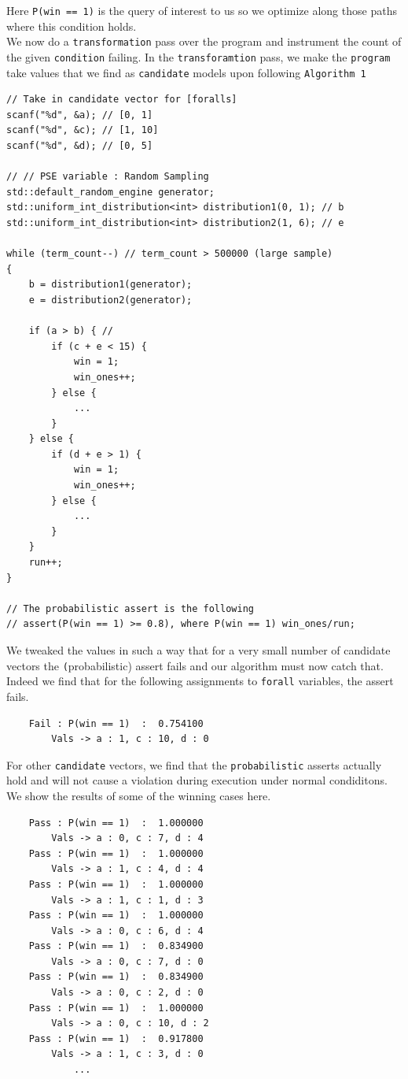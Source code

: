 \documentclass{article}
\begin{document}
Here \texttt{P(win == 1)} is the query of interest to us so we optimize along those paths where this condition holds. \\   

We now do a \texttt{transformation} pass over the program and instrument the count of the given \texttt{condition} failing. In the \texttt{transforamtion} pass, we make the \texttt{program} take values that we find as \texttt{candidate} models upon following \texttt{Algorithm 1}

\begin{verbatim}
// Take in candidate vector for [foralls]
scanf("%d", &a); // [0, 1]
scanf("%d", &c); // [1, 10]
scanf("%d", &d); // [0, 5]

// // PSE variable : Random Sampling
std::default_random_engine generator;
std::uniform_int_distribution<int> distribution1(0, 1); // b
std::uniform_int_distribution<int> distribution2(1, 6); // e

while (term_count--) // term_count > 500000 (large sample)
{
	b = distribution1(generator);
	e = distribution2(generator);
	
	if (a > b) { // 
		if (c + e < 15) {
			win = 1;
			win_ones++;
		} else {
			...
		}
	} else {
		if (d + e > 1) {
			win = 1;
			win_ones++;
		} else {
			...
		}
	}
	run++;
} 

// The probabilistic assert is the following
// assert(P(win == 1) >= 0.8), where P(win == 1) win_ones/run;

\end{verbatim}

We tweaked the values in such a way that for a very small number of candidate vectors the \texttt(probabilistic) assert fails and our algorithm must now catch that. Indeed we find that for the following assignments to \texttt{forall} variables, the assert fails.

\begin{verbatim}
	Fail : P(win == 1)  :  0.754100
		Vals -> a : 1, c : 10, d : 0
\end{verbatim}

For other \texttt{candidate} vectors, we find that the \texttt{probabilistic} asserts actually hold and will not cause a violation during execution under normal condiditons. We show the results of some of the winning cases here. 

\begin{verbatim}
	Pass : P(win == 1)  :  1.000000
		Vals -> a : 0, c : 7, d : 4
	Pass : P(win == 1)  :  1.000000
		Vals -> a : 1, c : 4, d : 4
	Pass : P(win == 1)  :  1.000000
		Vals -> a : 1, c : 1, d : 3
	Pass : P(win == 1)  :  1.000000
		Vals -> a : 0, c : 6, d : 4
	Pass : P(win == 1)  :  0.834900
		Vals -> a : 0, c : 7, d : 0
	Pass : P(win == 1)  :  0.834900
		Vals -> a : 0, c : 2, d : 0
	Pass : P(win == 1)  :  1.000000
		Vals -> a : 0, c : 10, d : 2
	Pass : P(win == 1)  :  0.917800
		Vals -> a : 1, c : 3, d : 0
			...
\end{verbatim}
\end{document}
